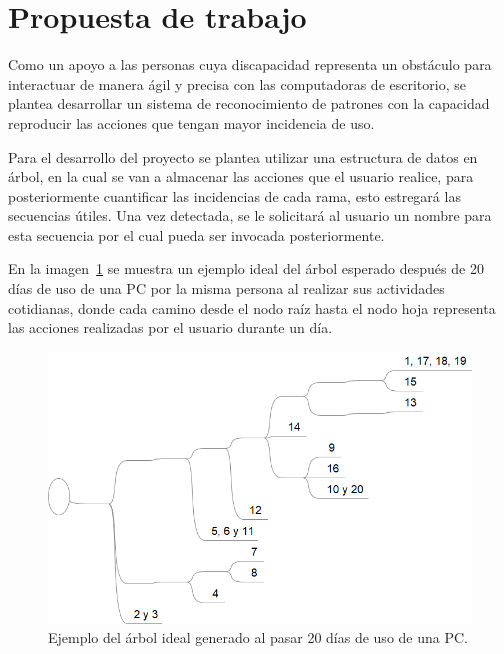 \section{Propuesta de trabajo}

Como un apoyo a las personas cuya discapacidad representa un obstáculo para
 interactuar de manera ágil y precisa con las computadoras de escritorio, se
 plantea desarrollar un sistema de reconocimiento de patrones con la capacidad
 reproducir las acciones que tengan mayor incidencia de uso. 
 
Para el desarrollo del proyecto se plantea utilizar una estructura de datos en
 árbol, en la cual se van a almacenar las acciones que el usuario realice, para
 posteriormente cuantificar las incidencias de cada rama, esto estregará las
 secuencias útiles. Una vez detectada, se le solicitará al usuario un nombre
 para esta secuencia por el cual pueda ser invocada posteriormente. 
 
En la imagen~\ref{fig:arbol} se muestra un ejemplo ideal del árbol esperado
 después de 20 días de uso de una PC por la misma persona al realizar sus
 actividades cotidianas, donde cada camino desde el nodo raíz hasta el nodo
 hoja representa las acciones realizadas por el usuario durante un día.
 
\begin{figure}[H]
\centering
\includegraphics[width=0.8\columnwidth]{CapituloI/Imagenes/Arbol.png}
\caption{Ejemplo del árbol ideal generado al pasar 20 días de uso de una PC.}
\label{fig:arbol}
\end{figure}